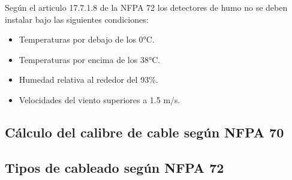 Según el articulo 17.7.1.8 de la NFPA 72 los detectores de humo no se deben instalar bajo las siguientes condiciones:


\begin{itemize}
	
	\item Temperaturas por debajo de los 0°C.
	
	\item Temperaturas por encima de los 38°C.
	
	\item Humedad relativa al rededor del 93\%.
	
	\item Velocidades del viento superiores a 1.5 m/s.
	
\end{itemize}

















\subsection{Cálculo del calibre de cable según NFPA 70}





\subsection{Tipos de cableado según NFPA 72}

